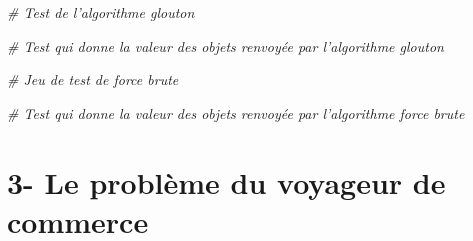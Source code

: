 \documentclass[
  paper=a4,
  ,captions=tableheading
]{scrartcl}
\newenvironment{Shaded}{}{}
\newcommand{\CommentTok}[1]{\textcolor[rgb]{0.38,0.63,0.69}{\textit{#1}}}
\begin{document}
\begin{Shaded}
\begin{Highlighting}[]
\CommentTok{\# Test de l’algorithme glouton}
\end{Highlighting}
\end{Shaded}

\begin{Shaded}
\begin{Highlighting}[]
\CommentTok{\# Test qui donne la valeur des objets renvoyée par l’algorithme glouton}
\end{Highlighting}
\end{Shaded}

\begin{Shaded}
\begin{Highlighting}[]
\CommentTok{\# Jeu de test de force brute}
\end{Highlighting}
\end{Shaded}

\begin{Shaded}
\begin{Highlighting}[]
\CommentTok{\# Test qui donne la valeur des objets renvoyée par l’algorithme force brute}
\end{Highlighting}
\end{Shaded}

\hypertarget{3--le-probluxe8me-du-voyageur-de-commerce}{%
\section{3- Le problème du voyageur de
commerce}\label{3--le-probluxe8me-du-voyageur-de-commerce}}
\end{document}
